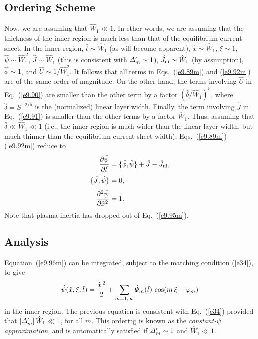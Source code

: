 \documentclass[12pt,prb,aps]{revtex4-1}
\begin{document}
\subsection{Ordering Scheme}
Now, we are assuming that $\hat{W}_1\ll 1$. In other words, we are assuming that the thickness of the
inner region is much less than that of the equilibrium current sheet. In the inner region,
$\hat{t}\sim \hat{W}_1$ (as will become apparent), $\hat{x}\sim \hat{W}_1$, $\xi\sim 1$, $\hat{\psi}\sim \hat{W}_1^{\,2}$, $\hat{J}\sim \hat{W}_1$ (this is
consistent with ${\mit\Delta}_m'\sim 1$), $\hat{J}_{\rm ni}\sim \hat{W}_1$ (by assumption), 
$\hat{\phi}\sim 1$, and $\hat{U}\sim 1/\hat{W}_1^2$.  It follows that all terms in Eqs.~(\ref{e9.89m}) and (\ref{e9.92m}) are of the same order of magnitude. On the other hand, the terms involving $\hat{U}$ in Eq.~(\ref{e9.90}) are 
smaller than the other term by a factor $(\hat{\delta}/\hat{W}_1)^5$, where $\hat{\delta}=S^{-2/5}$ is
the (normalized) linear layer width.\cite{fkr} Finally, the term involving $\hat{J}$ in Eq.~(\ref{e9.91})
is smaller than the other terms by a factor $\hat{W}_1$. Thus, assuming that $\hat{\delta}\ll \hat{W}_1\ll 1$ (i.e.,
the inner region is much wider than the linear layer width, but much thinner than the equilibrium current sheet width), Eqs.~(\ref{e9.89m})--(\ref{e9.92m})
reduce to 
\begin{align}
\frac{\partial\hat{\psi}}{\partial\hat{t}}&=\{\skew{3}\hat{\phi},\hat{\psi}\}+\hat{J}-\hat{J}_{\rm ni},\label{e9.94m}\\[0.5ex]
\{\hat{J},\hat{\psi}\}& = 0,\label{e9.95m}\\[0.5ex]
\frac{\partial^2\hat{\psi}}{\partial \hat{x}^2} &= 1\label{e9.96m}.
\end{align}
Note that plasma inertia has dropped out of Eq.~(\ref{e9.95m}). 

\subsection{Analysis}
Equation~(\ref{e9.96m}) can be integrated, subject to the matching condition (\ref{e34}), to give
\begin{equation}\label{e38}
\hat{\psi}(\hat{x},\xi,\hat{t}) = \frac{\hat{x}^{\,2}}{2} + \sum_{m=1,\infty}\hat{\mit \Psi}_m(\hat{t})\,\cos(m\,\xi-\varphi_m)
\end{equation}
in the inner region.
The previous equation is consistent with Eq.~(\ref{e34}) provided that $|{\mit\Delta}_m'|\,\hat{W}_1\ll 1$, for all $m$.  This ordering is
known as the {\em constant-$\psi$ approximation},\cite{fkr} and is automatically satisfied if ${\mit\Delta}_m'\sim 1$ and
$\hat{W}_1\ll 1$. 
\end{document}
